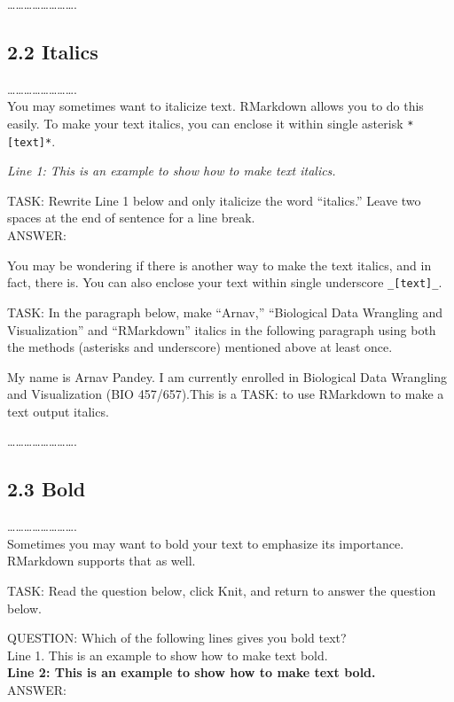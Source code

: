 \documentclass[
]{article}
\begin{document}
\ldots\ldots\ldots\ldots\ldots\ldots\ldots\ldots.

\subsection{2.2 Italics}\label{italics}

\ldots\ldots\ldots\ldots\ldots\ldots\ldots\ldots.\\
You may sometimes want to italicize text. RMarkdown allows you to do
this easily. To make your text italics, you can enclose it within single
asterisk \texttt{*{[}text{]}*}.

\emph{Line 1: This is an example to show how to make text italics.}

\hfill\break

TASK: Rewrite Line 1 below and only italicize the word ``italics.''
Leave two spaces at the end of sentence for a line break.\\
ANSWER:

\hfill\break

You may be wondering if there is another way to make the text italics,
and in fact, there is. You can also enclose your text within single
underscore \texttt{\_{[}text{]}\_}.

\hfill\break

TASK: In the paragraph below, make ``Arnav,'' ``Biological Data
Wrangling and Visualization'' and ``RMarkdown'' italics in the following
paragraph using both the methods (asterisks and underscore) mentioned
above at least once.

My name is Arnav Pandey. I am currently enrolled in Biological Data
Wrangling and Visualization (BIO 457/657).This is a TASK: to use
RMarkdown to make a text output italics.

\hfill\break

\ldots\ldots\ldots\ldots\ldots\ldots\ldots\ldots.

\subsection{2.3 Bold}\label{bold}

\ldots\ldots\ldots\ldots\ldots\ldots\ldots\ldots.\\
Sometimes you may want to bold your text to emphasize its importance.
RMarkdown supports that as well.

TASK: Read the question below, click Knit, and return to answer the
question below.

QUESTION: Which of the following lines gives you bold text?\\
Line 1. This is an example to show how to make text bold.\\
\textbf{Line 2: This is an example to show how to make text bold.}\\
ANSWER:
\end{document}
